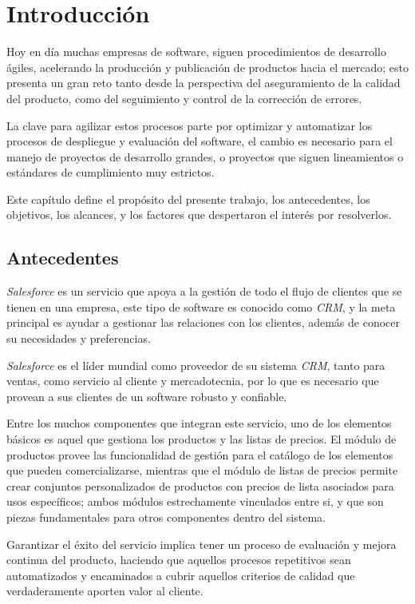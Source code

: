 \chapter{Introducción}

Hoy en día muchas empresas de software, siguen procedimientos de desarrollo
ágiles, acelerando la producción y publicación de productos hacia el mercado;
esto presenta un gran reto tanto desde la perspectiva del aseguramiento de la
calidad del producto, como del seguimiento y control de la corrección de
errores.

La clave para agilizar estos procesos parte por optimizar y automatizar los
procesos de despliegue y evaluación del software, el cambio es necesario para
el manejo de proyectos de desarrollo grandes, o proyectos que siguen
lineamientos o estándares de cumplimiento muy estrictos.

Este capítulo define el propósito del presente trabajo, los antecedentes, los
objetivos, los alcances, y los factores que despertaron el interés por
resolverlos.

\section{Antecedentes}
\emph{Salesforce} es un servicio que apoya a la gestión de todo el flujo de
clientes que se tienen en una empresa, este tipo de software es conocido como
\emph{CRM}, y la meta principal es ayudar a gestionar las relaciones con los
clientes, además de conocer su necesidades y preferencias.

\emph{Salesforce} es el líder mundial como proveedor de su sistema \emph{CRM},
tanto para ventas, como servicio al cliente y mercadotecnia, por lo que es
necesario que provean a sus clientes de un software robusto y confiable.

Entre los muchos componentes que integran este servicio, uno de los elementos
básicos es aquel que gestiona los productos y las listas de precios. El módulo
de productos provee las funcionalidad de gestión para el catálogo de
los elementos que pueden comercializarse, mientras que el módulo de listas de
precios permite crear conjuntos personalizados de productos con precios de
lista asociados para usos específicos; ambos módulos estrechamente vinculados
entre si, y que son piezas fundamentales para otros componentes dentro del
sistema.

Garantizar el éxito del servicio implica tener un proceso de evaluación y
mejora continua del producto, haciendo que aquellos procesos repetitivos sean
automatizados y encaminados a cubrir aquellos criterios de calidad que
verdaderamente aporten valor al cliente.

